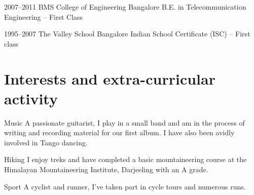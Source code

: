 \documentclass[11pt,a4paper,sans]{moderncv}        %
\begin{document}
\vspace{6pt}

\cventry
{\textcolor{light}{2007--2011}}
{BMS College of Engineering}
{Bangalore}
{}
{}
{B.E. in Telecommunication Engineering -- First Class}

\vspace{6pt}

\cventry
{\textcolor{light}{1995--2007}}
{The Valley School}
{Bangalore}
{}
{}
{Indian School Certificate (ISC) -- First class}

\vspace{6pt}

\section{Interests and extra-curricular activity}

\vspace{6pt}

\cvline
{\textcolor{light}{Music}}
{A passionate guitarist, I play in a small band and am in the process of writing and recording material for our first album. I have also been avidly involved in Tango dancing.}

\vspace{6pt}

\cvline
{\textcolor{light}{Hiking}}
{I enjoy treks and have completed a basic mountaineering course at the Himalayan Mountaineering Institute, Darjeeling with an A grade.}

\vspace{6pt}

\cvline
{\textcolor{light}{Sport}}
{A cyclist and runner, I've taken part in cycle tours and numerous runs.}

\vspace{6pt}

\nocite{*}



\end{document}
